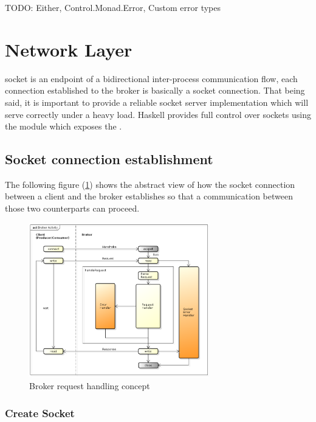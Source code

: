 TODO: Either, Control.Monad.Error, Custom error types


\section{Network Layer}

socket is an endpoint of a bidirectional inter-process communication flow, each
connection established to the broker is basically a socket connection. That
being said, it is important to provide a reliable socket server implementation
which will serve correctly under a heavy load. Haskell provides full control
over sockets using the
module which exposes the .

\subsection{Socket connection establishment}

The following figure (\ref{fig:broker-activity}) shows the abstract view of how
the socket connection between a client and the broker establishes so that a
communication between those two counterparts can proceed.

\begin{figure}[H]
    \centering
    \includegraphics[width=0.7\textwidth]{images/broker-activity.png}
    \caption{Broker request handling concept}
    \label{fig:broker-activity}
\end{figure}

\subsubsection{Create Socket}

